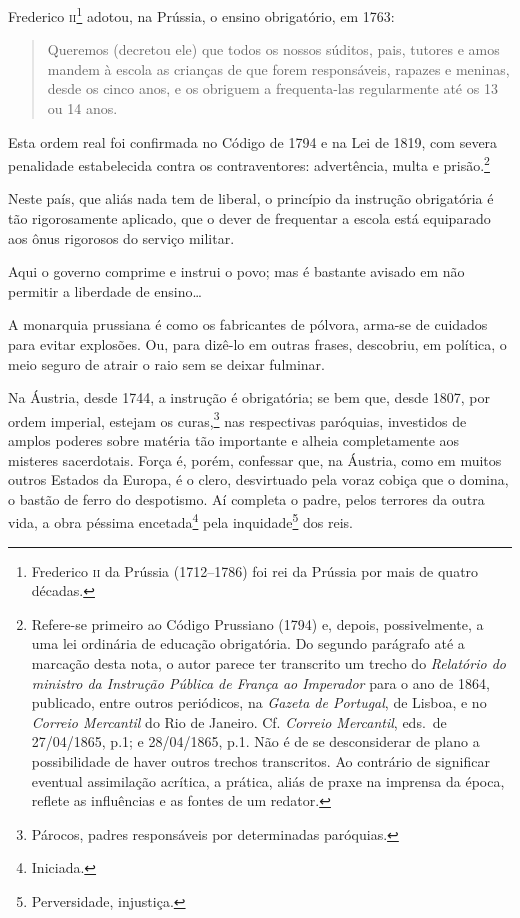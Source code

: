 Frederico \textsc{ii}\footnote{Frederico \textsc{ii} da Prússia (1712--1786) foi rei da
  Prússia por mais de quatro décadas.} adotou, na Prússia, o ensino
obrigatório, em 1763:

\begin{quote}
Queremos (decretou ele) que todos os nossos súditos, pais, tutores e
amos mandem à escola as crianças de que forem responsáveis, rapazes e
meninas, desde os cinco anos, e os obriguem a frequenta-las regularmente
até os 13 ou 14 anos.
\end{quote}

Esta ordem real foi confirmada no Código de 1794 e na Lei de 1819, com
severa penalidade estabelecida contra os contraventores: advertência,
multa e prisão.\footnote{Refere-se primeiro ao Código Prussiano (1794)
  e, depois, possivelmente, a uma lei ordinária de educação obrigatória.
  Do segundo parágrafo até a marcação desta nota, o autor parece ter
  transcrito um trecho do \emph{Relatório do ministro da Instrução
  Pública de França ao Imperador} para o ano de 1864, publicado, entre
  outros periódicos, na \emph{Gazeta de Portugal}, de Lisboa, e no
  \emph{Correio Mercantil} do Rio de Janeiro. Cf. \emph{Correio
  Mercantil}, eds.~de 27/04/1865, p.1; e 28/04/1865, p.1. Não é de se
  desconsiderar de plano a possibilidade de haver outros trechos
  transcritos. Ao contrário de significar eventual assimilação acrítica,
  a prática, aliás de praxe na imprensa da época, reflete as influências
  e as fontes de um redator.}

Neste país, que aliás nada tem de liberal, o princípio da instrução
obrigatória é tão rigorosamente aplicado, que o dever de frequentar a
escola está equiparado aos ônus rigorosos do serviço militar.

Aqui o governo comprime e instrui o povo; mas é bastante avisado em não
permitir a liberdade de ensino\ldots{}

A monarquia prussiana é como os fabricantes de pólvora, arma-se de
cuidados para evitar explosões. Ou, para dizê-lo em outras frases,
descobriu, em política, o meio seguro de atrair o raio sem se deixar
fulminar.

Na Áustria, desde 1744, a instrução é obrigatória; se bem que, desde
1807, por ordem imperial, estejam os curas,\footnote{Párocos, padres
  responsáveis por determinadas paróquias.} nas respectivas paróquias,
investidos de amplos poderes sobre matéria tão importante e alheia
completamente aos misteres sacerdotais. Força é, porém, confessar que,
na Áustria, como em muitos outros Estados da Europa, é o clero,
desvirtuado pela voraz cobiça que o domina, o bastão de ferro do
despotismo. Aí completa o padre, pelos terrores da outra vida, a obra
péssima encetada\footnote{Iniciada.} pela inquidade\footnote{
  Perversidade, injustiça.} dos reis.

